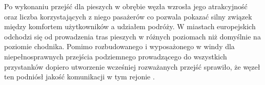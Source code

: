 \documentclass[twoside,12pt]{article}
\begin{document}
	Po wykonaniu przejść dla pieszych w obrębie węzła wzrosła jego atrakcyjność oraz liczba korzystających z niego pasażerów co pozwala pokazać silny związek między komfortem użytkowników a udziałem podróży. W miastach europejskich odchodzi się od prowadzenia tras pieszych w różnych poziomach niż domyślnie na poziomie chodnika. Pomimo rozbudowanego i wyposażonego w windy dla niepełnosprawnych przejścia podziemnego prowadzącego do wszystkich przystanków dopiero utworzenie wcześniej rozważanych przejść sprawiło, że węzeł ten podniósł jakość komunikacji w tym rejonie \cite{grunwaldzki3}. 
	
	


\clearpage

\end{document}
